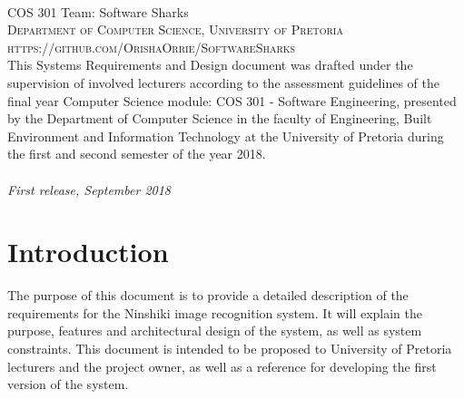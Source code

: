 \documentclass[a4paper, 11pt]{article}
\begin{document}
\pagebreak


\newpage
~\vfill
\thispagestyle{empty}

\noindent COS 301 Team: Software Sharks\\ 

\noindent \textsc{Department of Computer Science, University of Pretoria}\\

\noindent \textsc{https://github.com/OrishaOrrie/SoftwareSharks}\\ %
\linebreak
\noindent This Systems Requirements and Design document was drafted under the supervision of involved lecturers according to the assessment guidelines of the final year Computer Science module: COS 301 - Software Engineering, presented by the Department of Computer Science in the faculty of Engineering, Built Environment and Information Technology at the University of Pretoria during the first and second semester of the year 2018. \\ \\

\noindent \textit{First release, September 2018} %

\pagebreak
\tableofcontents

\pagebreak
\section{Introduction}
The purpose of this document is to provide a detailed description of the requirements for the Ninshiki image recognition system. It will explain the purpose, features and architectural design of the system, as well as system constraints. This document is intended to be proposed to University of Pretoria lecturers and the project owner, as well as a reference for developing the first version of the system.
\end{document}
